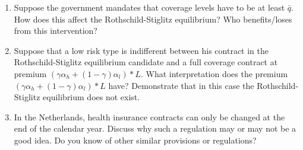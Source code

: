 \documentclass[a4paper]{article}
\begin{document}
\begin{enumerate}[resume]
\item Suppose the government mandates that coverage levels have to be at least \(\bar q\). How does this affect the Rothschild-Stiglitz equilibrium? Who benefits/loses from this intervention?

\item Suppose that a low risk type is indifferent between his contract in the Rothschild-Stiglitz equilibrium candidate and a full coverage contract at premium \((\gamma\alpha_h+(1-\gamma)\alpha_l)*L\). What interpretation does the premium \((\gamma\alpha_h+(1-\gamma)\alpha_l)*L\) have? Demonstrate that in this case the Rothschild-Stiglitz equilibrium does not exist.

\item In the Netherlands, health insurance contracts can only be changed at the end of the calendar year. Discuss why such a regulation may or may not be a good idea. Do you know of other similar provisions or regulations?
\end{enumerate}
\end{document}
